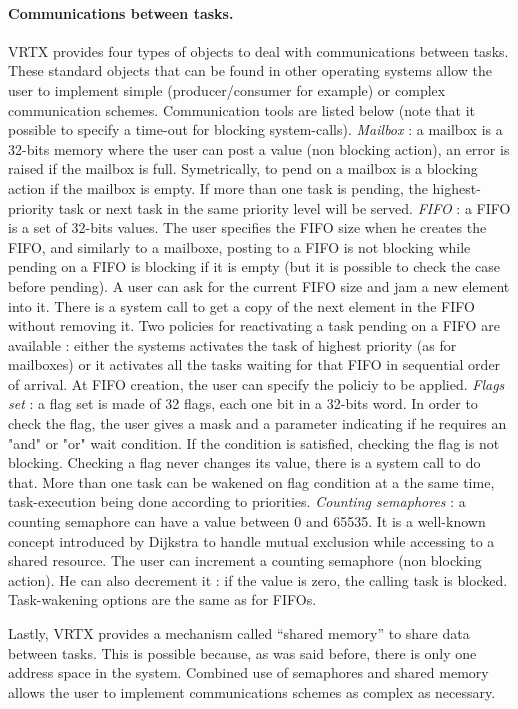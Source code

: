 \documentclass[10pt]{report}
\begin{document}
\paragraph{Communications between tasks.} VRTX provides four types of objects to deal with communications 
between tasks. These standard objects that can be found in other 
operating systems allow the user to implement simple 
(producer/consumer for example) or complex communication schemes. 
Communication tools are listed below (note that it possible to 
specify a time-out for blocking system-calls). {\em Mailbox} : a 
mailbox is a 32-bits memory where the user can post a value (non 
blocking action), an error is raised if the mailbox is full. 
Symetrically, to pend on a mailbox is a blocking action if the 
mailbox is empty. If more than one task is pending, the 
highest-priority task or next task in the same priority level 
will be served. {\em FIFO} :
a FIFO is a set of 32-bits values. The 
user specifies the FIFO size when he creates the FIFO, and 
similarly to a mailboxe, posting to a FIFO is not blocking while 
pending on a FIFO is blocking if it is empty (but it is possible 
to check the case before pending). A user can ask for the current 
FIFO size and jam a new element into it. There is a system call 
to get a copy of the next element in the FIFO without removing 
it. Two policies for reactivating a task pending on a FIFO are 
available : either the systems activates the task of highest 
priority (as for mailboxes) or it activates all the tasks waiting 
for that FIFO in sequential order of arrival. At FIFO creation, 
the user can specify the policiy to be applied. {\em Flags set} : a 
flag set is made of 32 flags, each one bit in a 32-bits word. In 
order to check the flag, the user gives a mask and a parameter 
indicating if he requires an "and" or "or" wait condition. If the 
condition is satisfied, checking the flag is not blocking. 
Checking a flag never changes its value, there is a system call 
to do that. More than one task can be wakened on flag condition 
at a the same time, task-execution being done according to 
priorities. {\em Counting semaphores} : a counting semaphore can have 
a value between 0 and 65535. It is a well-known concept 
introduced by Dijkstra to handle mutual exclusion while accessing 
to a shared resource. The user can increment a counting semaphore 
(non blocking action). He can also decrement it : if the value is 
zero, the calling task is blocked. Task-wakening options are the 
same as for FIFOs.

Lastly, VRTX provides a mechanism called “shared memory” to share 
data between tasks. This is possible because, as was said before, 
there is only one address space in the system. Combined use of 
semaphores and shared memory allows the user to implement 
communications schemes as complex as necessary.
\end{document}

